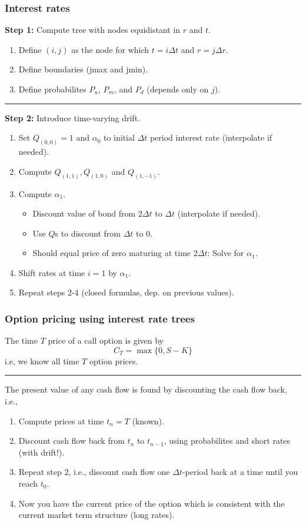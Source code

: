 \begin{frame}
  \frametitle{Interest rates}
\textbf{Step 1:} Compute tree with nodes equidistant in $r$ and $t$.
%
\begin{enumerate}
\item Define $(i, j)$ as the node for which $t = i \Delta t$
  and $r = j \Delta r$.
\item Define boundaries (jmax and jmin).
\item Define probabilites $P_u$, $P_m$, and $P_d$ (depends
  only on $j$).
\end{enumerate}
%
\vspace{0.25cm}
\hrule
\vspace{0.25cm}
%
\textbf{Step 2:} Introduce time-varying drift.
\begin{enumerate}
\item Set $Q_{(0,0)} = 1$ and $\alpha_{0}$ to initial
  $\Delta t$ period interest rate (interpolate if needed).
\item Compute $Q_{(1,1)}, Q_{(1,0)}$ and $Q_{(1,-1)}$.
\item Compute $\alpha_{1}$.
  \begin{itemize}
  \item Discount value of bond from $2\Delta t$ to $\Delta
    t$ (interpolate if needed).
  \item Use $Q$s to discount from $\Delta t$ to 0.
  \item Should equal price of zero maturing at time $2\Delta
    t$: Solve for $\alpha_{1}$.
  \end{itemize}
\item Shift rates at time $i = 1$ by $\alpha_{1}$.
\item Repeat steps 2-4 (closed formulas, dep. on previous values).
\end{enumerate}
%
\end{frame}


\begin{frame}[fragile]
  \frametitle{Option pricing using interest rate trees}
  The time $T$ price of a call option is given by
  \begin{equation}
    C_T = \operatorname{max} \{ 0, S - K \}
  \end{equation}
  i.e, we know all time $T$ option prices.
\vspace{0.25cm}
\hrule
\vspace{0.25cm}
  The present value of any cash flow is found by discounting
  the cash flow back, i.e.,
  \begin{enumerate}
  \item Compute prices at time $t_n = T$ (known).
  \item Discount cash flow back from $t_n$ to $t_{n-1}$,
    using probabilites and short rates (with drift!).
  \item Repeat step 2, i.e., discount cash flow one $\Delta
    t$-period back at a time until you reach $t_0$.
  \item Now you have the current price of the option which
    is consistent with the current market term structure
    (long rates).
  \end{enumerate}
\end{frame}

